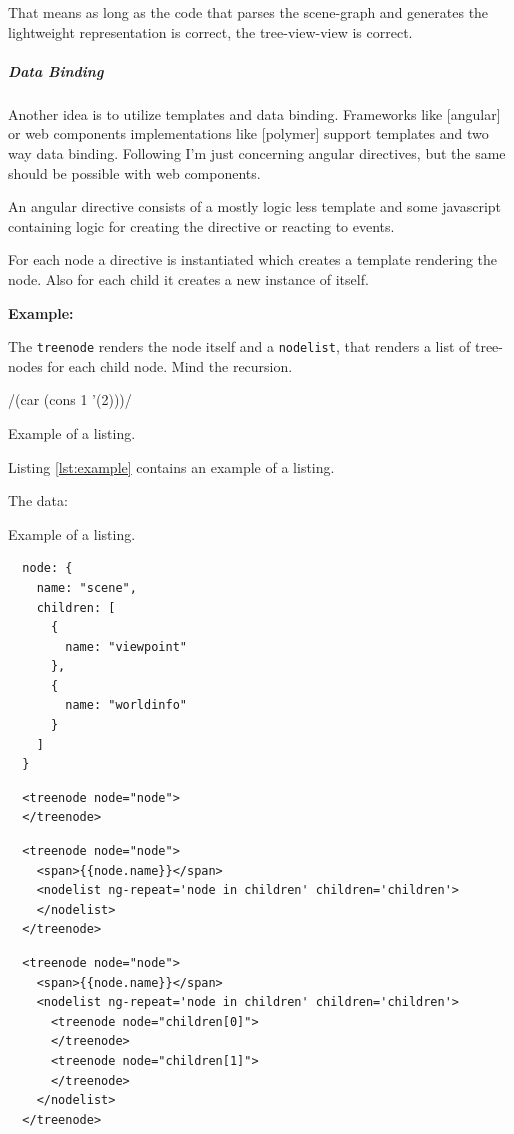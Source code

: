 That means as long as the code that parses the scene-graph and generates
the lightweight representation is correct, the tree-view-view is
correct.

\subparagraph{Data Binding}\label{data-binding}

Another idea is to utilize templates and data binding. Frameworks like
{[}angular{]} or web components implementations like {[}polymer{]}
support templates and two way data binding. Following I'm just
concerning angular directives, but the same should be possible with web
components.

An angular directive consists of a mostly logic less template and some
javascript containing logic for creating the directive or reacting to
events.

For each node a directive is instantiated which creates a template
rendering the node. Also for each child it creates a new instance of
itself.

\textbf{Example:}

The \texttt{treenode} renders the node itself and a \texttt{nodelist},
that renders a list of tree-nodes for each child node. Mind the
recursion.

\begin{listing}[H]
/(car (cons 1 '(2)))/
\caption{Example of a listing.}
\label{lst:example}
\end{listing}
Listing \ref{lst:example} contains an example of a listing.

The data:
\begin{listing}[H]
  \caption{Example of a listing.}
  \begin{verbatim}
  node: {
    name: "scene",
    children: [
      {
        name: "viewpoint"
      },
      {
        name: "worldinfo"
      }
    ]
  }
  \end{verbatim}
\end{listing}

\begin{verbatim}
  <treenode node="node">
  </treenode>
\end{verbatim}

\begin{verbatim}
  <treenode node="node">
    <span>{{node.name}}</span>
    <nodelist ng-repeat='node in children' children='children'>
    </nodelist>
  </treenode>
\end{verbatim}

\begin{verbatim}
  <treenode node="node">
    <span>{{node.name}}</span>
    <nodelist ng-repeat='node in children' children='children'>
      <treenode node="children[0]">
      </treenode>
      <treenode node="children[1]">
      </treenode>
    </nodelist>
  </treenode>
\end{verbatim}

